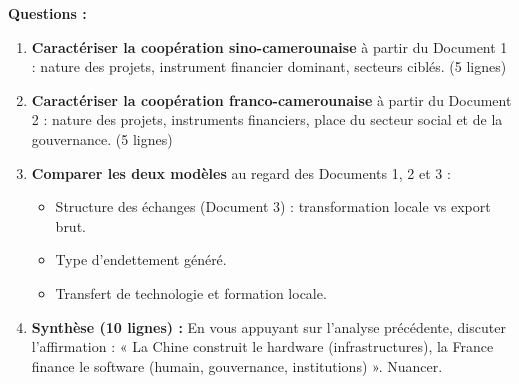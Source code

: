 \documentclass[11pt]{article}
\begin{document}
\begin{exercice}
\textbf{Questions :}
\begin{enumerate}
\item \textbf{Caractériser la coopération sino-camerounaise} à partir du Document 1 : nature des projets, instrument financier dominant, secteurs ciblés. (5 lignes)
\item \textbf{Caractériser la coopération franco-camerounaise} à partir du Document 2 : nature des projets, instruments financiers, place du secteur social et de la gouvernance. (5 lignes)
\item \textbf{Comparer les deux modèles} au regard des Documents 1, 2 et 3 : 
\begin{itemize}
\item Structure des échanges (Document 3) : transformation locale vs export brut.
\item Type d'endettement généré.
\item Transfert de technologie et formation locale.
\end{itemize}
\item \textbf{Synthèse (10 lignes) :} En vous appuyant sur l'analyse précédente, discuter l'affirmation : « La Chine construit le hardware (infrastructures), la France finance le software (humain, gouvernance, institutions) ». Nuancer.
\end{enumerate}
\end{exercice}
\end{document}
